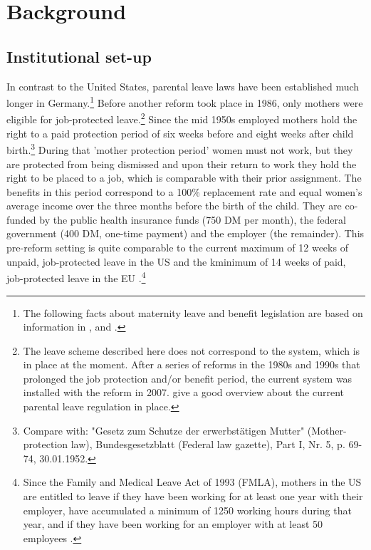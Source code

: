 \documentclass[11pt, a4paper,draft]{article} %
\begin{document}
\section{Background}\label{sec:background}
\subsection{Institutional set-up}
In contrast to the United States, parental leave laws have been established much longer in Germany.\footnote{The following facts about maternity leave and benefit legislation are based on information in \cite{DIW2002}, \cite{schonberg2014expansions} and  \cite{zmarzlik1999mutterschutzgesetz}.} Before another reform took place in 1986, only mothers were eligible for job-protected leave.\footnote{The leave scheme described here does not correspond to the system, which is in place at the moment. After a series of reforms in the 1980s and 1990s that prolonged the job protection and/or benefit period, the current system was installed with the reform in 2007. \cite{Kluve2013} give a good overview about the current parental leave regulation in place.} Since the mid 1950s employed mothers hold the right to a paid protection period of six weeks before and eight weeks after child birth.\footnote{Compare with: "Gesetz zum Schutze der erwerbstätigen Mutter" (Mother-protection law), Bundesgesetzblatt (Federal law gazette), Part I, Nr. 5, p. 69-74, 30.01.1952.} 
 \newline During that 'mother protection period' women must not work, but they are protected from being dismissed and upon their return to work they hold the right to be placed to a job, which is comparable with their prior assignment. The benefits in this period correspond to a 100\% replacement rate and equal women's average income over the three months before the birth of the child. They are co-funded by the public health insurance funds (750 DM per month), the federal government (400 DM, one-time payment) and the employer (the remainder). This pre-reform setting is quite comparable to the current maximum of 12 weeks of unpaid, job-protected leave in the US and the kminimum of 14 weeks of paid, job-protected leave in the EU \citep{guertzgen2018}.\footnote{Since the Family and Medical Leave Act of 1993 (FMLA), mothers in the US are entitled to leave if they have been working for at least one year with their employer, have accumulated a minimum of 1250 working hours during that year, and if they have been working for an employer with at least 50 employees \citep{baum2003effect}.} \newline
\end{document}
